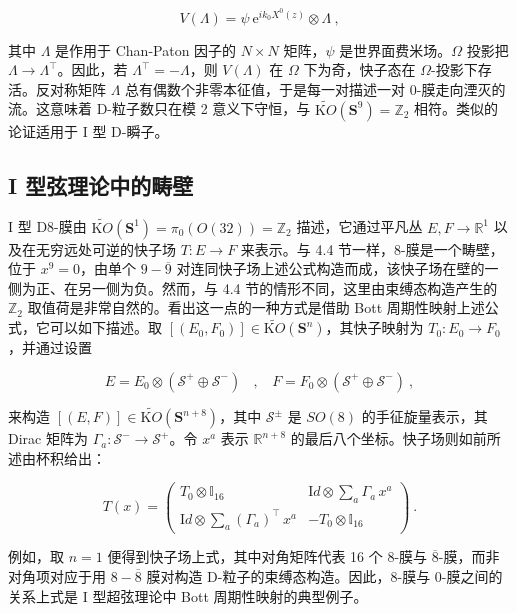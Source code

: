 \documentclass[11pt,a4paper]{ctexart}
\newcommand{\SrcRange}[2]{\marginpar{\raggedright\footnotesize 原文 p.#1}}
\begin{document}
\[V(\Lambda)=\psi~\mbox{e}^{ik_0X^0(z)}\otimes\Lambda\ ,\]

其中 \(\Lambda\) 是作用于 Chan-Paton 因子的 \(N\times N\) 矩阵，\(\psi\) 是世界面费米场。\(\Omega\) 投影把 \(\Lambda\rightarrow \Lambda^\top\)。因此，若 \(\Lambda^\top=-\Lambda\)，则 \(V(\Lambda)\) 在 \(\Omega\) 下为奇，快子态在 \(\Omega\)-投影下存活。反对称矩阵 \(\Lambda\) 总有偶数个非零本征值，于是每一对描述一对 0-膜走向湮灭的流。这意味着 D-粒子数只在模 2 意义下守恒，与 \(\widetilde{{\mathrm KO}}({\mathbf S}^9)={\mathbb{Z}}_2\) 相符。类似的论证适用于 I 型 D-瞬子。

\SrcRange{59}{59}
\subsection{I 型弦理论中的畴壁}\label{i-ux578bux5f26ux7406ux8bbaux4e2dux7684ux7574ux58c1}

I 型 D8-膜由 \(\widetilde{{\mathrm KO}}({\mathbf S}^1)=\pi_0(O(32))={\mathbb{Z}}_2\) 描述，它通过平凡丛 \(E, F\rightarrow {\mathbb{R}}^1\) 以及在无穷远处可逆的快子场 \(T:E\to F\) 来表示。与 4.4 节一样，8-膜是一个畴壁，位于 \(x^9=0\)，由单个 \(9-\overline{9}\) 对连同快子场上述公式构造而成，该快子场在壁的一侧为正、在另一侧为负。然而，与 4.4 节的情形不同，这里由束缚态构造产生的 \({\mathbb{Z}}_2\) 取值荷是非常自然的。看出这一点的一种方式是借助 Bott 周期性映射上述公式，它可以如下描述。取 \([(E_0,F_0)]\in \widetilde{{\mathrm KO}}({\mathbf S}^n)\)，其快子映射为 \(T_0:E_0\rightarrow F_0\)，并通过设置

\[E=E_0\otimes ({\mathcal S}^+\oplus {\mathcal S}^-)\ \ \ \ , \ \ \ \
F=F_0\otimes ({\mathcal S}^+\oplus {\mathcal S}^-)\ ,\]

来构造 \([(E,F)]\in \widetilde{{\mathrm KO}}({\mathbf S}^{n+8})\)，其中 \({\mathcal S}^{\pm}\) 是 \(SO(8)\) 的手征旋量表示，其 Dirac 矩阵为 \(\Gamma_a: {\mathcal S}^-\rightarrow {\mathcal S}^+\)。令 \(x^a\) 表示 \({\mathbb{R}}^{n+8}\) 的最后八个坐标。快子场则如前所述由杯积给出：

\[T(x)=\left( \begin{array}{cc}T_0\otimes{\mathbb{I}}_{16}&{\mathrm Id}\otimes
\sum_a\Gamma_a\,x^a\\
{\mathrm Id}\otimes\sum_a(\Gamma_a)^\top\,x^a&-T_0\otimes{\mathbb{I}}_{16}
\end{array}\right)\ .\]

例如，取 \(n=1\) 便得到快子场上式，其中对角矩阵代表 16 个 8-膜与 \(\overline{8}\)-膜，而非对角项对应于用 \(8-\overline{8}\) 膜对构造 D-粒子的束缚态构造。因此，8-膜与 0-膜之间的关系上式是 I 型超弦理论中 Bott 周期性映射的典型例子。
\end{document}
